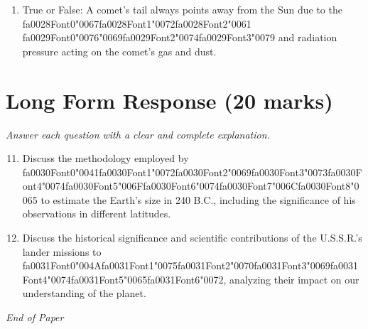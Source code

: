 \documentclass[12pt]{article}
\begin{document}
\begin{enumerate}[label=\arabic*.]
\item True or False: A comet's tail always points away from the Sun due to the {\csname fa0028Font0\endcsname\char"0067}{\csname fa0028Font1\endcsname\char"0072}{\csname fa0028Font2\endcsname\char"0061} {\csname fa0029Font0\endcsname\char"0076}{\char"0069}{\csname fa0029Font2\endcsname\char"0074}{\csname fa0029Font3\endcsname\char"0079} and radiation pressure acting on the comet's gas and dust.
\end{enumerate}

\section*{Long Form Response (20 marks)}
\textit{Answer each question with a clear and complete explanation.}
\begin{enumerate}[label=\arabic*.]
\setcounter{enumi}{10}
\item Discuss the methodology employed by {\csname fa0030Font0\endcsname\char"0041}{\csname fa0030Font1\endcsname\char"0072}{\csname fa0030Font2\endcsname\char"0069}{\csname fa0030Font3\endcsname\char"0073}{\csname fa0030Font4\endcsname\char"0074}{\csname fa0030Font5\endcsname\char"006F}{\csname fa0030Font6\endcsname\char"0074}{\csname fa0030Font7\endcsname\char"006C}{\csname fa0030Font8\endcsname\char"0065} to estimate the Earth's size in 240 B.C.,
including the significance of his observations in different latitudes.
\item Discuss the historical significance and scientific contributions of the U.S.S.R.'s lander
missions to {\csname fa0031Font0\endcsname\char"004A}{\csname fa0031Font1\endcsname\char"0075}{\csname fa0031Font2\endcsname\char"0070}{\csname fa0031Font3\endcsname\char"0069}{\csname fa0031Font4\endcsname\char"0074}{\csname fa0031Font5\endcsname\char"0065}{\csname fa0031Font6\endcsname\char"0072}, analyzing their impact on our understanding of the planet.
\end{enumerate}

\vfill
\noindent\textit{End of Paper}
\end{document}
